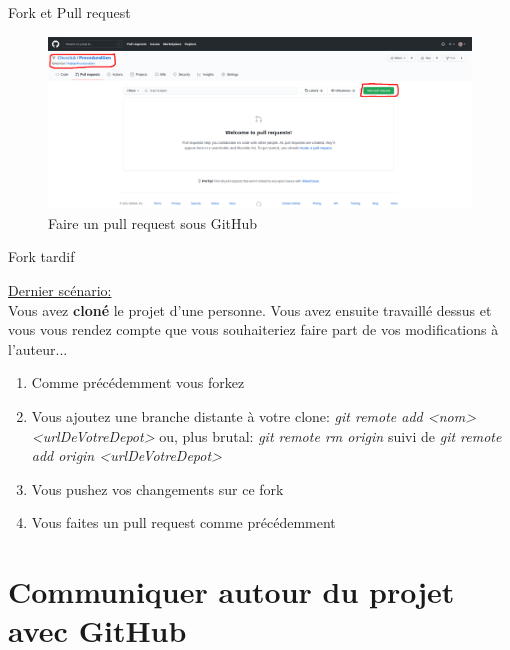 \documentclass{beamer}
\begin{document}
\begin{frame}{Fork et Pull request}
\begin{figure}[h!]
    \includegraphics[scale=0.15]{images/droits_push/pull_request.png}
    \caption{Faire un pull request sous GitHub}
\end{figure}
\end{frame}


\begin{frame}{Fork tardif}

\underline{Dernier scénario:}\\
\smallskip
Vous avez \textbf{cloné} le projet d'une personne. Vous avez ensuite travaillé dessus et vous vous rendez compte que vous souhaiteriez faire part de vos modifications à l'auteur...\\
\medskip

\begin{enumerate}
    \item Comme précédemment vous forkez
    \item Vous ajoutez une branche distante à votre clone: \textit{git remote add <nom> <urlDeVotreDepot>} ou, plus brutal: \textit{git remote rm origin} suivi de \textit{git remote add origin <urlDeVotreDepot>}
    \item Vous pushez vos changements sur ce fork
    \item Vous faites un pull request comme précédemment
\end{enumerate}
\end{frame}






\section{Communiquer autour du projet avec GitHub}
\end{document}
